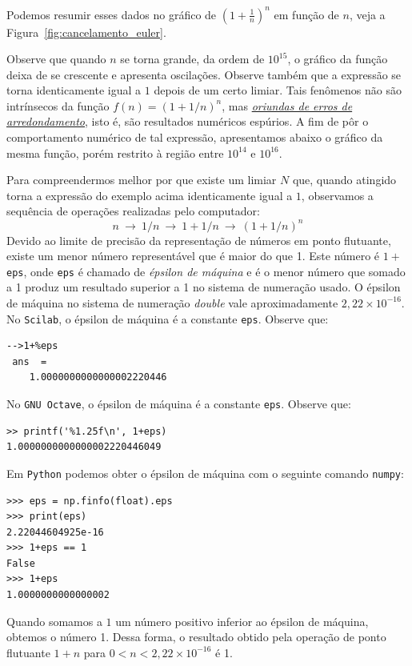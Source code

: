 \begin{ex}
Podemos resumir esses dados no gráfico de $\left(1+\frac{1}{n}\right)^n$ em função de $n$, veja a Figura~\ref{fig:cancelamento_euler}.

Observe que quando $n$ se torna grande, da ordem de $10^{15}$, o gráfico da função deixa de se crescente e apresenta oscilações.  Observe também que a expressão se torna identicamente igual a $1$ depois de um certo limiar. Tais fenômenos não são intrínsecos da função $f(n)=(1+1/n)^n$, mas \emph{\uline{oriundas de erros de arredondamento}}, isto é, são resultados numéricos espúrios. A fim de pôr o comportamento numérico de tal expressão, apresentamos abaixo o gráfico da mesma função, porém restrito à região entre $10^{14}$ e $10^{16}$.

Para compreendermos melhor por que existe um limiar $N$ que, quando atingido torna a expressão do exemplo acima identicamente igual a $1$, observamos a sequência de operações realizadas pelo computador:
\begin{equation}\label{seq_oper}
n~\to ~1/n ~\to ~1+1/n ~\to ~(1+1/n)^n
\end{equation}
Devido ao limite de precisão da representação de números em ponto flutuante, existe um menor número representável que é maior do que 1. Este número é $1 + $\verb+eps+, onde \verb+eps+ é chamado de \emph{épsilon de máquina} e é o menor número que somado a 1 produz um resultado superior a 1 no sistema de numeração usado. O épsilon de máquina no sistema de numeração \emph{double} vale aproximadamente $2,22\times 10^{-16}$.
\ifisscilab
No \verb+Scilab+, o épsilon de máquina é a constante \verb+eps+. Observe que:
\begin{verbatim}
-->1+%eps
 ans  =
    1.0000000000000002220446 
\end{verbatim}
\fi
\ifisoctave
No \verb+GNU Octave+, o épsilon de máquina é a constante \verb+eps+. Observe que:
\begin{verbatim}
>> printf('%1.25f\n', 1+eps)
1.0000000000000002220446049
\end{verbatim}
\fi
\ifispython
Em \verb+Python+ podemos obter o épsilon de máquina com o seguinte comando \verb+numpy+:
\begin{verbatim}
>>> eps = np.finfo(float).eps
>>> print(eps)
2.22044604925e-16
>>> 1+eps == 1
False
>>> 1+eps
1.0000000000000002
\end{verbatim}
\fi
Quando somamos a $1$ um número positivo inferior ao épsilon de máquina, obtemos o número 1. Dessa forma, o resultado obtido pela operação de ponto flutuante $1+n$ para $0<n<2,22 \times 10^{-16}$ é 1. 


\end{ex}
